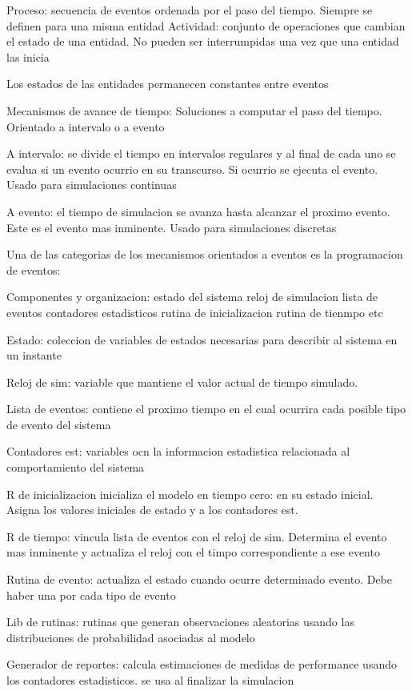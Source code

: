 \documentclass[a4paper]{article}
\begin{document}
Proceso: secuencia de eventos ordenada por el paso del tiempo. Siempre se definen para una
misma entidad
Actividad: conjunto de operaciones que cambian el estado de una entidad. No pueden ser 
interrumpidas una vez que una entidad las inicia

Los estados de las entidades permanecen constantes entre eventos

Mecanismos de avance de tiempo:
Soluciones a computar el paso del tiempo. Orientado a intervalo o a evento

A intervalo: se divide el tiempo en intervalos regulares y al final de cada uno se evalua
si un evento ocurrio en su transcurso. Si ocurrio se ejecuta el evento. Usado para
simulaciones continuas

A evento: el tiempo de simulacion se avanza hasta alcanzar el proximo evento. Este es el 
evento mas inminente. Usado para simulaciones discretas

Una de las categorias de los mecanismos orientados a eventos es la programacion de eventos:

Componentes y organizacion:
estado del sistema
reloj de simulacion
lista de eventos
contadores estadisticos
rutina de inicializacion
rutina de tienmpo
etc

Estado: coleccion de variables de estados necesarias para describir al sistema en un instante

Reloj de sim:
variable que mantiene el valor actual de tiempo simulado.

Lista de eventos:
contiene el proximo tiempo en el cual ocurrira cada posible tipo de evento del sistema

Contadores est:
variables ocn la informacion estadistica relacionada al comportamiento del sistema

R de inicializacion
inicializa el modelo en tiempo cero: en su estado inicial. Asigna los valores iniciales de
estado y a los contadores est.

R de tiempo:
vincula lista de eventos con el reloj de sim. Determina el evento mas inminente y actualiza
el reloj con el timpo correspondiente a ese evento

Rutina de evento:
actualiza el estado cuando ocurre determinado evento. Debe haber una por cada tipo de evento

Lib de rutinas:
rutinas que generan observaciones aleatorias usando las distribuciones de probabilidad 
asociadas al modelo

Generador de reportes:
calcula estimaciones de medidas de performance usando los contadores estadisticos. se usa
al finalizar la simulacion
\end{document}
